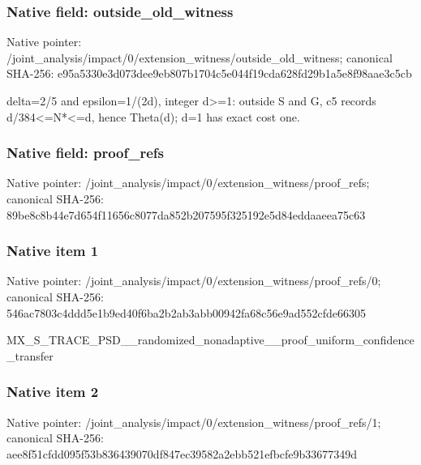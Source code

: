 \documentclass[10pt,a4paper]{article}
\begin{document}
\subsubsection{Native field: outside\_\allowbreak{}old\_\allowbreak{}witness}
Native pointer: /joint\_\allowbreak{}analysis/impact/0/extension\_\allowbreak{}witness/outside\_\allowbreak{}old\_\allowbreak{}witness; canonical SHA-256: e95a5330e3d073dee9eb807b1704c5e044f19cda628fd29b1a5e8f98aae3c5cb

\begingroup\raggedright\sloppy delta=\allowbreak{}2/\allowbreak{}5 and epsilon=\allowbreak{}1/\allowbreak{}(2d),\allowbreak{} integer d>=\allowbreak{}1:\allowbreak{} outside S and G,\allowbreak{} c5 records d/\allowbreak{}384<=\allowbreak{}N*<=\allowbreak{}d,\allowbreak{} hence Theta(d);\allowbreak{} d=\allowbreak{}1 has exact cost one.\par\endgroup

\subsubsection{Native field: proof\_\allowbreak{}refs}
Native pointer: /joint\_\allowbreak{}analysis/impact/0/extension\_\allowbreak{}witness/proof\_\allowbreak{}refs; canonical SHA-256: 89be8c8b44e7d654f11656c8077da852b207595f325192e5d84eddaaeea75c63

\subsubsection{Native item 1}
Native pointer: /joint\_\allowbreak{}analysis/impact/0/extension\_\allowbreak{}witness/proof\_\allowbreak{}refs/0; canonical SHA-256: 546ac7803c4ddd5e1b9ed40f6ba2b2ab3abb00942fa68c56e9ad552cfde66305

\begingroup\raggedright\sloppy MX\_\allowbreak{}S\_\allowbreak{}TRACE\_\allowbreak{}PSD\_\allowbreak{}\_\allowbreak{}randomized\_\allowbreak{}nonadaptive\_\allowbreak{}\_\allowbreak{}proof\_\allowbreak{}uniform\_\allowbreak{}confidence\_\allowbreak{}transfer\par\endgroup

\subsubsection{Native item 2}
Native pointer: /joint\_\allowbreak{}analysis/impact/0/extension\_\allowbreak{}witness/proof\_\allowbreak{}refs/1; canonical SHA-256: aee8f51cfdd095f53b836439070df847ec39582a2ebb521efbcfe9b33677349d
\end{document}
